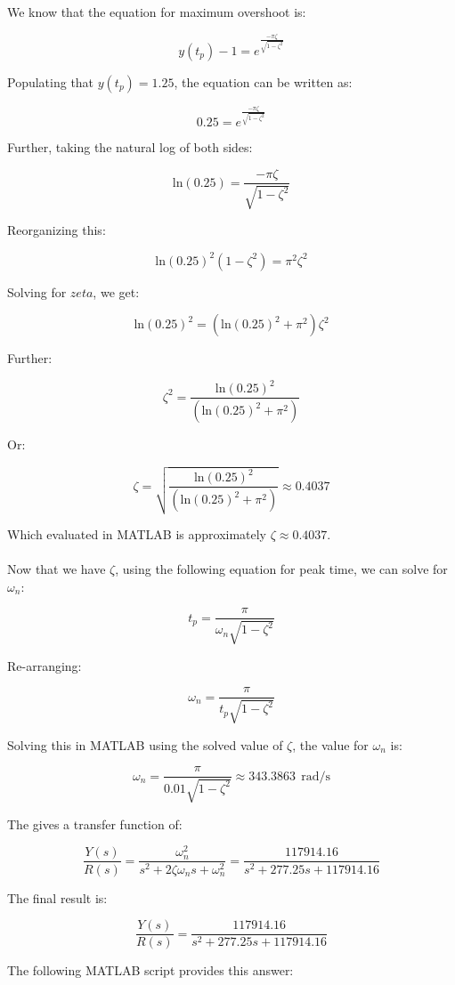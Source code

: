 \documentclass[12pt, letterpaper]{../assignment}
\begin{document}
We know that the equation for maximum overshoot is:

$$ y(t_p) - 1 = e^\frac{-\pi \zeta}{\sqrt{1 - \zeta^2}} $$

Populating that $ y(t_p) = 1.25 $, the equation can be written as:

$$ 0.25 = e^\frac{-\pi \zeta}{\sqrt{1 - \zeta^2}} $$

Further, taking the natural log of both sides:

$$ \text{ln}(0.25) = \frac{-\pi \zeta}{\sqrt{1 - \zeta^2}} $$

Reorganizing this:

$$ \text{ln}(0.25)^2 (1 - \zeta^2) = \pi^2 \zeta^2 $$

Solving for $zeta$, we get:

$$ \text{ln}(0.25)^2 = (\text{ln}(0.25)^2 + \pi^2) \zeta^2 $$

Further:

$$ \zeta^2 = \frac{\text{ln}(0.25)^2}{(\text{ln}(0.25)^2 + \pi^2)} $$

Or:

$$ \zeta = \sqrt{\frac{\text{ln}(0.25)^2}{(\text{ln}(0.25)^2 + \pi^2)}} \approx 0.4037 $$

Which evaluated in MATLAB is approximately $ \zeta \approx 0.4037 $.
\\\\
Now that we have $\zeta$, using the following equation for peak time, we can solve for $\omega_n$:

$$ t_p = \frac{\pi}{\omega_n \sqrt{1-\zeta^2}} $$

Re-arranging:

$$ \omega_n = \frac{\pi}{ t_p \sqrt{1-\zeta^2}} $$

Solving this in MATLAB using the solved value of $\zeta$, the value for $\omega_n$ is:

$$ \omega_n = \frac{\pi}{ 0.01 \sqrt{1-\zeta^2}} \approx 343.3863\ \ \text{rad/s} $$

The gives a transfer function of:

$$ \frac{Y(s)}{R(s)} = \frac{\omega_n^2}{s^2 + 2 \zeta \omega_n s + \omega_n^2 } = \frac{117914.16}{s^2 + 277.25s + 117914.16 } $$

The final result is:
\begin{answer}
$$ \frac{Y(s)}{R(s)} = \frac{117914.16}{s^2 + 277.25s + 117914.16 } $$
\end{answer}

The following MATLAB script provides this answer:
\end{document}

